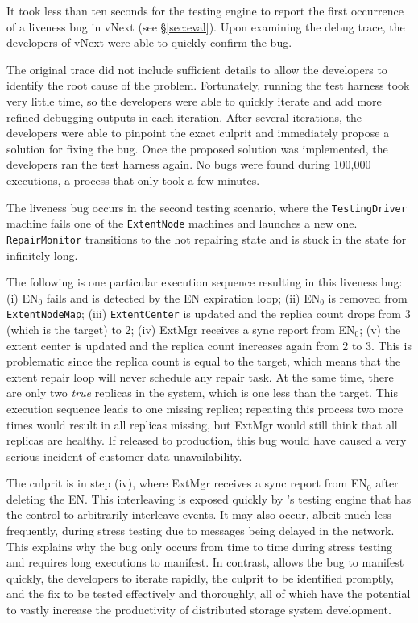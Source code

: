 It took less than ten seconds for the \psharp testing engine to report the first occurrence of a liveness bug in vNext (see \S\ref{sec:eval}). Upon examining the debug trace, the developers of vNext were able to quickly confirm the bug.

The original \psharp trace did not include sufficient details to allow the developers to identify the root cause of the problem. Fortunately, running the test harness took very little time, so the developers were able to quickly iterate and add more refined debugging outputs in each iteration. After several iterations, the developers were able to pinpoint the exact culprit and immediately propose a solution for fixing the bug. Once the proposed solution was implemented, the developers ran the test harness again. No bugs were found during 100,000 executions, a process that only took a few minutes.

The liveness bug occurs in the second testing scenario, where the \texttt{TestingDriver} machine fails one of the \texttt{ExtentNode} machines and launches a new one. \texttt{RepairMonitor} transitions to the hot repairing state and is stuck in the state for infinitely long.

The following is one particular execution sequence resulting in this liveness bug: (i) EN$_0$ fails and is detected by the EN expiration loop; (ii) EN$_0$ is removed from \texttt{ExtentNodeMap}; (iii) \texttt{ExtentCenter} is updated and the replica count drops from 3 (which is the target) to 2; (iv) ExtMgr receives a sync report from EN$_0$; (v) the extent center is updated and the replica count increases again from 2 to 3. This is problematic since the replica count is equal to the target, which means that the extent repair loop will never schedule any repair task. At the same time, there are only two \emph{true} replicas in the system, which is one less than the target. This execution sequence leads to one missing replica; repeating this process two more times would result in all replicas missing, but ExtMgr would still think that all replicas are healthy. If released to production, this bug would have caused a very serious incident of customer data unavailability.

The culprit is in step (iv), where ExtMgr receives a sync report from EN$_0$ after deleting the EN. This interleaving is exposed quickly by \psharp's testing engine that has the control to arbitrarily interleave events. It may also occur, albeit much less frequently, during stress testing due to messages being delayed in the network. This explains why the bug only occurs from time to time during stress testing and requires long executions to manifest. In contrast, \psharp allows the bug to manifest quickly, the developers to iterate rapidly, the culprit to be identified promptly, and the fix to be tested effectively and thoroughly, all of which have the potential to vastly increase the productivity of distributed storage system development.
